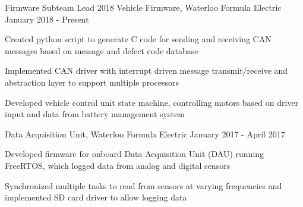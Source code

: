 

\begin{cventries}
  \cventrytwo
    {Firmware Subteam Lead} %
    {2018 Vehicle Firmware, Waterloo Formula Electric} %
    {} %
    {January 2018 - Present} %
    {
      \begin{cvitems}
        \item {Created python script to generate C code for sending and receiving CAN messages based on message and defect code database}
        \item {Implemented CAN driver with interrupt driven message transmit/receive and abstraction layer to support multiple processors}
        \item {Developed vehicle control unit state machine, controlling motors based on driver input and data from battery management system}
      \end{cvitems}
    }

  \cventrythree
    {}
    {Data Acquisition Unit, Waterloo Formula Electric} %
    {} %
    {January 2017 - April 2017} %
    {
      \begin{cvitems} %
        \item {Developed firmware for onboard Data Acquisition Unit (DAU) running FreeRTOS, which logged data from analog and digital sensors}
        \item {Synchronized multiple tasks to read from sensors at varying frequencies and implemented SD card driver to allow logging data}
      \end{cvitems}
    }


\end{cventries}
